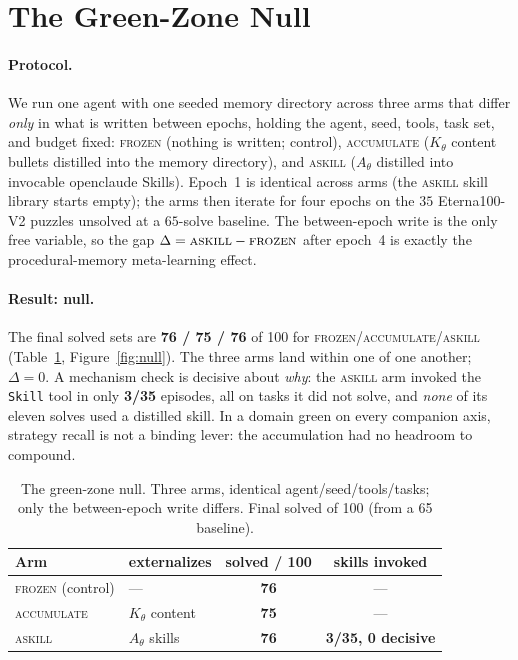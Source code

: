 \documentclass[11pt]{article}
\newcommand{\Ath}{A_{\theta}}
\begin{document}
\section{The Green-Zone Null}\label{sec:null}
\paragraph{Protocol.} We run one agent with one seeded memory directory across three arms that differ
\emph{only} in what is written between epochs, holding the agent, seed, tools, task set, and budget
fixed: \textsc{frozen} (nothing is written; control), \textsc{accumulate} ($K_\theta$ content bullets
distilled into the memory directory), and \textsc{askill} ($\Ath$ distilled into invocable openclaude
Skills). Epoch~1 is identical across arms (the \textsc{askill} skill library starts empty); the arms
then iterate for four epochs on the $35$ Eterna100-V2 puzzles unsolved at a $65$-solve baseline. The
between-epoch write is the only free variable, so the gap $\Delta=\textsc{askill}-\textsc{frozen}$ after
epoch~4 is exactly the procedural-memory meta-learning effect.

\paragraph{Result: null.} The final solved sets are \textbf{76 / 75 / 76} of 100 for
\textsc{frozen}/\textsc{accumulate}/\textsc{askill}
(Table~\ref{tab:null}, Figure~\ref{fig:null}).%
The three arms land within one of one another; $\Delta=0$. A mechanism check is decisive about
\emph{why}: the \textsc{askill} arm invoked the \texttt{Skill} tool in only \textbf{3/35} episodes, all
on tasks it did not solve, and \emph{none} of its eleven solves used a distilled skill. In a domain
green on every companion axis, strategy recall is not a binding lever: the accumulation had no headroom
to compound.

\begin{table}[t]\centering\small
\caption{The green-zone null. Three arms, identical agent/seed/tools/tasks; only the between-epoch
write differs. Final solved of 100 (from a 65 baseline).}
\label{tab:null}
\begin{tabular}{@{}llcc@{}}
\toprule
Arm & externalizes & solved / 100 & skills invoked\\
\midrule
\textsc{frozen} (control) & --- & \textbf{76} & ---\\
\textsc{accumulate} & $K_\theta$ content & \textbf{75} & ---\\
\textsc{askill} & $\Ath$ skills & \textbf{76} & \textbf{3/35, 0 decisive}\\
\bottomrule
\end{tabular}
\end{table}
\end{document}
